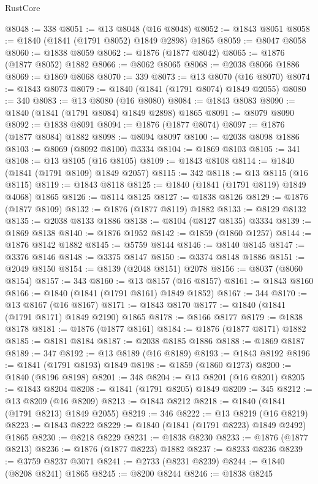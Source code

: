 \begin{lexlean}{RustCore}
\begin{coremodule}
@8048 := 338
@8051 := @13 @8048 (@16 @8048)
@8052 := @1843 @8051
@8058 := @1840 (@1841 (@1791 @8052) @1849 @2898) @1865
@8059 := @8047 @8058
@8060 := @1838 @8059
@8062 := @1876 (@1877 @8042)
@8065 := @1876 (@1877 @8052) @1882
@8066 := @8062 @8065
@8068 := @2038 @8066 @1886
@8069 := @1869 @8068
@8070 := 339
@8073 := @13 @8070 (@16 @8070)
@8074 := @1843 @8073
@8079 := @1840 (@1841 (@1791 @8074) @1849 @2055)
@8080 := 340
@8083 := @13 @8080 (@16 @8080)
@8084 := @1843 @8083
@8090 := @1840 (@1841 (@1791 @8084) @1849 @2898) @1865
@8091 := @8079 @8090
@8092 := @1838 @8091
@8094 := @1876 (@1877 @8074)
@8097 := @1876 (@1877 @8084) @1882
@8098 := @8094 @8097
@8100 := @2038 @8098 @1886
@8103 := @8069 (@8092 @8100) @3334
@8104 := @1869 @8103
@8105 := 341
@8108 := @13 @8105 (@16 @8105)
@8109 := @1843 @8108
@8114 := @1840 (@1841 (@1791 @8109) @1849 @2057)
@8115 := 342
@8118 := @13 @8115 (@16 @8115)
@8119 := @1843 @8118
@8125 := @1840 (@1841 (@1791 @8119) @1849 @4068) @1865
@8126 := @8114 @8125
@8127 := @1838 @8126
@8129 := @1876 (@1877 @8109)
@8132 := @1876 (@1877 @8119) @1882
@8133 := @8129 @8132
@8135 := @2038 @8133 @1886
@8138 := @8104 (@8127 @8135) @3334
@8139 := @1869 @8138
@8140 := @1876 @1952
@8142 := @1859 (@1860 @1257)
@8144 := @1876 @8142 @1882
@8145 := @5759 @8144
@8146 := @8140 @8145
@8147 := @3376 @8146
@8148 := @3375 @8147
@8150 := @3374 @8148 @1886
@8151 := @2049 @8150
@8154 := @8139 (@2048 @8151) @2078
@8156 := @8037 (@8060 @8154)
@8157 := 343
@8160 := @13 @8157 (@16 @8157)
@8161 := @1843 @8160
@8166 := @1840 (@1841 (@1791 @8161) @1849 @1852)
@8167 := 344
@8170 := @13 @8167 (@16 @8167)
@8171 := @1843 @8170
@8177 := @1840 (@1841 (@1791 @8171) @1849 @2190) @1865
@8178 := @8166 @8177
@8179 := @1838 @8178
@8181 := @1876 (@1877 @8161)
@8184 := @1876 (@1877 @8171) @1882
@8185 := @8181 @8184
@8187 := @2038 @8185 @1886
@8188 := @1869 @8187
@8189 := 347
@8192 := @13 @8189 (@16 @8189)
@8193 := @1843 @8192
@8196 := @1841 (@1791 @8193) @1849
@8198 := @1859 (@1860 @1273)
@8200 := @1840 (@8196 @8198)
@8201 := 348
@8204 := @13 @8201 (@16 @8201)
@8205 := @1843 @8204
@8208 := @1841 (@1791 @8205) @1849
@8209 := 345
@8212 := @13 @8209 (@16 @8209)
@8213 := @1843 @8212
@8218 := @1840 (@1841 (@1791 @8213) @1849 @2055)
@8219 := 346
@8222 := @13 @8219 (@16 @8219)
@8223 := @1843 @8222
@8229 := @1840 (@1841 (@1791 @8223) @1849 @2492) @1865
@8230 := @8218 @8229
@8231 := @1838 @8230
@8233 := @1876 (@1877 @8213)
@8236 := @1876 (@1877 @8223) @1882
@8237 := @8233 @8236
@8239 := @3759 @8237 @3071
@8241 := @2733 (@8231 @8239)
@8244 := @1840 (@8208 @8241) @1865
@8245 := @8200 @8244
@8246 := @1838 @8245

\end{coremodule}
\end{lexlean}
